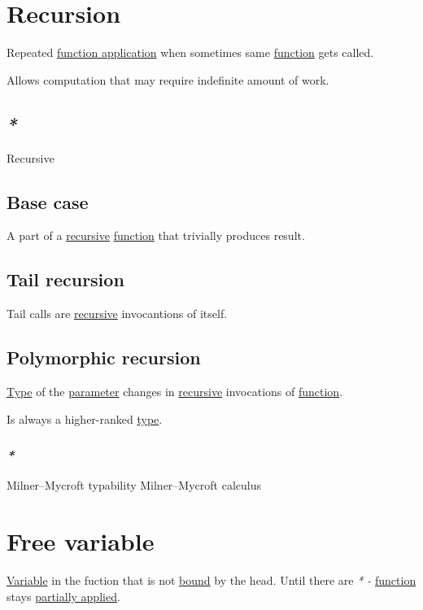 \documentclass[a4paper,14pt,oneside]{book}
\begin{document}
\section{\label{org8d0429c}Recursion}
\label{sec:org65f61df}
Repeated \hyperref[org28a93c6]{function application} when sometimes same \hyperref[org679af45]{function} gets called.

Allows computation that may require indefinite amount of work.

\subsection{\emph{*}}
\label{sec:org2a42581}

\label{org361c254}Recursive

\subsection{\label{org2145cb1}Base case}
\label{sec:orgab36d02}
A part of a \hyperref[org361c254]{recursive} \hyperref[org679af45]{function} that trivially produces result.

\subsection{\label{org8a8edcd}Tail recursion}
\label{sec:org0f17046}
Tail calls are \hyperref[org361c254]{recursive} invocantions of itself.

\subsection{\label{org52f6163}Polymorphic recursion}
\label{sec:org96aea6f}
\hyperref[org1eff537]{Type} of the \hyperref[orgae9d304]{parameter} changes in \hyperref[org361c254]{recursive} invocations of \hyperref[org679af45]{function}.

Is always a higher-ranked \hyperref[org1eff537]{type}.

\subsubsection{\emph{*}}
\label{sec:org7e0895b}

\label{org100ddb1}Milner–Mycroft typability
\label{orgdb994ef}Milner–Mycroft calculus

\section{\label{orgedbea45}Free variable}
\label{sec:org8984296}
\hyperref[org33ad64d]{Variable} in the fuction that is not \hyperref[orgf9c4712]{bound} by the head.
Until there are \emph{* -} \hyperref[org679af45]{function} stays \hyperref[org416d1c5]{partially applied}.
\end{document}

